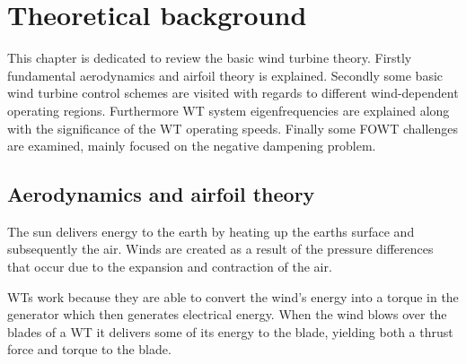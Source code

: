 \section{Theoretical background} \label{sec:theory}
This chapter is dedicated to review the basic wind turbine theory. Firstly fundamental aerodynamics and airfoil theory is explained. Secondly some basic wind turbine control schemes are visited with regards to different wind-dependent operating regions. Furthermore WT system eigenfrequencies are explained along with the significance of the WT operating speeds. Finally some FOWT challenges are examined, mainly focused on the negative dampening problem.

\subsection{Aerodynamics and airfoil theory} \label{sec:theory_aero}
The sun delivers energy to the earth by heating up the earths surface and subsequently the air. Winds are created as a result of the pressure differences that occur due to the expansion and contraction of the air. 

WTs work because they are able to convert the wind's energy into a torque in the generator which then generates electrical energy. When the wind blows over the blades of a WT it delivers some of its energy to the blade, yielding both a thrust force and torque to the blade.

